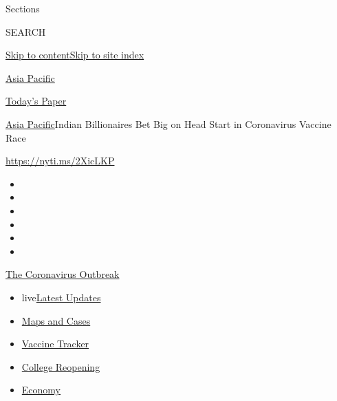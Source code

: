 Sections

SEARCH

\protect\hyperlink{site-content}{Skip to
content}\protect\hyperlink{site-index}{Skip to site index}

\href{https://www.nytimes.com/section/world/asia}{Asia Pacific}

\href{https://myaccount.nytimes.com/auth/login?response_type=cookie\&client_id=vi}{}

\href{https://www.nytimes.com/section/todayspaper}{Today's Paper}

\href{/section/world/asia}{Asia Pacific}\textbar{}Indian Billionaires
Bet Big on Head Start in Coronavirus Vaccine Race

\url{https://nyti.ms/2XicLKP}

\begin{itemize}
\item
\item
\item
\item
\item
\item
\end{itemize}

\href{https://www.nytimes.com/news-event/coronavirus?action=click\&pgtype=Article\&state=default\&region=TOP_BANNER\&context=storylines_menu}{The
Coronavirus Outbreak}

\begin{itemize}
\tightlist
\item
  live\href{https://www.nytimes.com/2020/08/03/world/coronavirus-covid-19.html?action=click\&pgtype=Article\&state=default\&region=TOP_BANNER\&context=storylines_menu}{Latest
  Updates}
\item
  \href{https://www.nytimes.com/interactive/2020/us/coronavirus-us-cases.html?action=click\&pgtype=Article\&state=default\&region=TOP_BANNER\&context=storylines_menu}{Maps
  and Cases}
\item
  \href{https://www.nytimes.com/interactive/2020/science/coronavirus-vaccine-tracker.html?action=click\&pgtype=Article\&state=default\&region=TOP_BANNER\&context=storylines_menu}{Vaccine
  Tracker}
\item
  \href{https://www.nytimes.com/2020/08/02/us/covid-college-reopening.html?action=click\&pgtype=Article\&state=default\&region=TOP_BANNER\&context=storylines_menu}{College
  Reopening}
\item
  \href{https://www.nytimes.com/live/2020/08/03/business/stock-market-today-coronavirus?action=click\&pgtype=Article\&state=default\&region=TOP_BANNER\&context=storylines_menu}{Economy}
\end{itemize}

